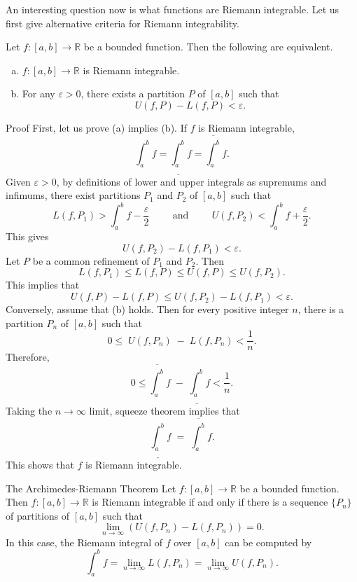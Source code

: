An interesting question now is what functions are Riemann integrable. 
Let us first give alternative criteria for Riemann integrability.
\begin{lemma}[label=230220_10]
{}
Let $f:[a,b]\to\mathbb{R}$ be a bounded function. Then the following are equivalent.
\begin{enumerate}[(a)]
\item $f:[a,b]\to\mathbb{R}$  is Riemann integrable.
\item For any $\varepsilon>0$, there exists a partition $P$ of $[a,b]$ such that
\[U(f,P)-L(f,P)<\varepsilon.\]
 

\end{enumerate}
\end{lemma}
\begin{myproof}{Proof}
First, let us prove (a)  implies  (b). If $f$ is Riemann integrable, \[\int_a^bf=\underline{\int_a^b}f =\overline{\int_a^b} f.\] Given $\varepsilon>0$, by definitions of lower and upper integrals as supremums and infimums, there exist partitions $P_1$ and $P_2$ of $[a,b]$ such that
\[L(f,P_1)>\int_a^b f-\frac{\varepsilon}{2}\hspace{1cm}\text{and}\hspace{1cm}
U(f,P_2)<\int_a^b f+\frac{\varepsilon}{2}.\]
This gives 
\[U(f,P_2)-L(f,P_1)<\varepsilon.\]
Let $P$ be a common refinement of $P_1$ and $P_2$. Then
\[L(f,P_1)\leq L(f,P)\leq U(f,P)\leq U(f,P_2).\]
This implies that
\[
U(f,P)-L(f,P) \leq U(f,P_2)-L(f,P_1)< \varepsilon.
\]
Conversely, assume that (b) holds. Then for every positive integer $n$, there is a partition $P_n$ of $[a,b]$ such that\bp
\[0\leq \;U(f,P_n)\;-\;L(f,P_n)<\frac{1}{n}.\]
Therefore,
\[0\leq\overline{\int_a^b }f \;-\;\underline{\int_a^b} f <\frac{1}{n}.\]
Taking the  $n\to \infty$ limit, squeeze theorem implies that
\[\underline{\int_a^b} f\;=\;\overline{\int_a^b }f.\]
This shows that $f$ is Riemann integrable.
\end{myproof}
 
\begin{theorem}[label=230220_11]
{The Archimedes-Riemann Theorem}
Let $f:[a,b]\to\mathbb{R}$ be a bounded function. Then $f:[a,b]\to\mathbb{R}$  is Riemann integrable if and only if there is a sequence $\{P_n\}$ of partitions of $[a,b]$ such that
\begin{equation}\label{eq230220_12}\lim_{n\to \infty}(U(f,P_n)-L(f,P_n))=0.\end{equation}
In this case, the Riemann integral of $f$ over $[a,b]$ can be computed by
\begin{equation}\label{eq230220_13}\int_a^b f=\lim_{n\to\infty}L(f,P_n)=\lim_{n\to\infty}U(f,P_n).\end{equation}
\end{theorem}

